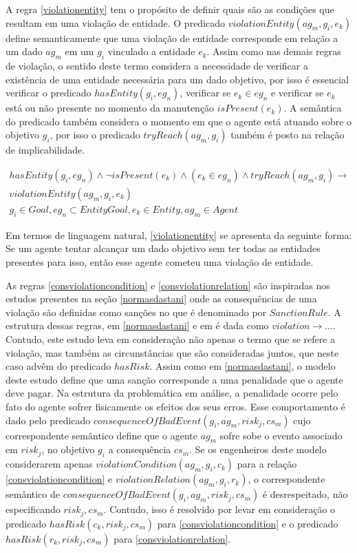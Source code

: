 A regra \ref{violationentity} tem o propósito de definir quais são as condições que resultam em uma violação de entidade. O predicado $violationEntity(ag_m,g_i,e_k)$ define semanticamente que uma violação de entidade corresponde em relação a um dado $ag_m$ em um $g_i$ vinculado a entidade $e_k$. Assim como nas demais regras de violação, o sentido deste termo considera a necessidade de verificar a existência de uma entidade necessária para um dado objetivo, por isso é essencial verificar o predicado $hasEntity(g_i,eg_n)$, verificar se $e_k \in eg_n$ e verificar se $e_k$ está ou não presente no momento da manutenção $isPresent(e_k)$. A semântica do predicado também considera o momento em que o agente está atuando sobre o objetivo $g_i$, por isso o predicado $tryReach(ag_m,g_i)$ também é posto na relação de implicabilidade.

\begin{eqnarray}\label{violationentity}\nonumber
	hasEntity(g_i,eg_n) \wedge \neg isPresent(e_k) 	\wedge (e_k \in eg_n) \wedge tryReach(ag_m,g_i) \to \nonumber \\ 
    violationEntity(ag_m,g_i,e_k)  \nonumber \\  
    g_i \in Goal, eg_n \subset EntityGoal, e_k \in Entity, ag_m \in Agent
\end{eqnarray}

Em termos de linguagem natural, \ref{violationentity} se apresenta da seguinte forma: Se um agente tentar alcançar um dado objetivo sem ter todas as entidades presentes para isso, então esse agente cometeu uma violação de entidade.

As regras \ref{consviolationcondition} e \ref{consviolationrelation} são inspiradas nos estudos presentes na seção \ref{normasdastani} onde as consequências de uma violação são definidas como sanções no que é denominado por $Sanction Rule$. A estrutura dessas regras, em \ref{normasdastani} e em \cite{dastaniframework} é dada como $violation \to ... $. Contudo, este estudo leva em consideração não apenas o termo que se refere a violação, mas também as circunstâncias que são consideradas juntos, que neste caso advêm do predicado $hasRisk$. Assim como em \ref{normasdastani}, o modelo deste estudo define que uma sanção corresponde a uma penalidade que o agente deve pagar. Na estrutura da problemática em análise, a penalidade ocorre pelo fato do agente sofrer fisicamente os efeitos dos seus erros. Esse comportamento é dado pelo predicado $consequenceOfBadEvent(g_i,ag_m,risk_j,cs_m)$ cujo correspondente semântico define que o agente $ag_m$ sofre sobe o evento associado em $risk_j$, no objetivo $g_i$ a consequência $cs_m$. Se os engenheiros deste modelo considerarem apenas $violationCondition(ag_m,g_i,c_k)$ para a relação \ref{consviolationcondition} e $violationRelation(ag_m,g_i,r_k)$, o correspondente semântico de $consequenceOfBadEvent(g_i,ag_m,risk_j,cs_m)$ é desrespeitado, não especificando $risk_j,cs_m$. Contudo, isso é resolvido por levar em consideração o predicado $hasRisk(c_k,risk_j,cs_m)$ para \ref{consviolationcondition} e o predicado $hasRisk(r_k,risk_j,cs_m)$ para \ref{consviolationrelation}. 

